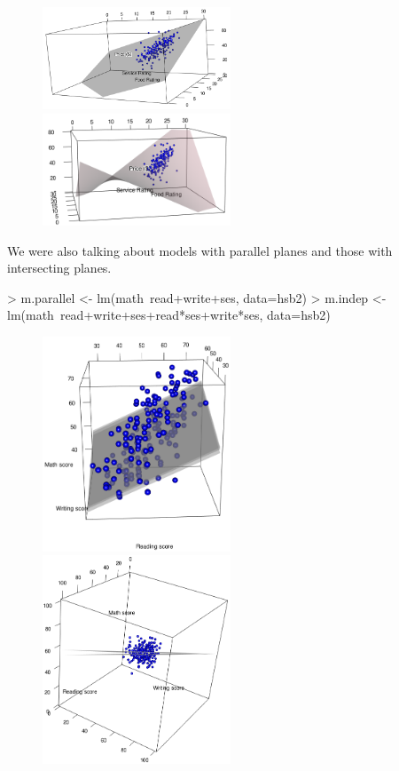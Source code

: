 \documentclass[10pt]{article}
\begin{document}
\begin{figure}[htbp]
\includegraphics[width=0.5\textwidth]{figure/flatplane.png}
\includegraphics[width=0.5\textwidth]{figure/warpedplane.png}
\end{figure}

We were also talking about models with parallel planes and those with intersecting planes. 


\begin{Schunk}
\begin{Sinput}
> m.parallel <- lm(math~read+write+ses, data=hsb2)
> m.indep <-lm(math~read+write+ses+read*ses+write*ses, data=hsb2)
\end{Sinput}
\end{Schunk}


\begin{figure}[htbp]
\includegraphics[width=0.5\textwidth]{figure/parallelplanes.png}
\includegraphics[width=0.5\textwidth]{figure/intersectingplanes.png}
\end{figure}
\end{document}
